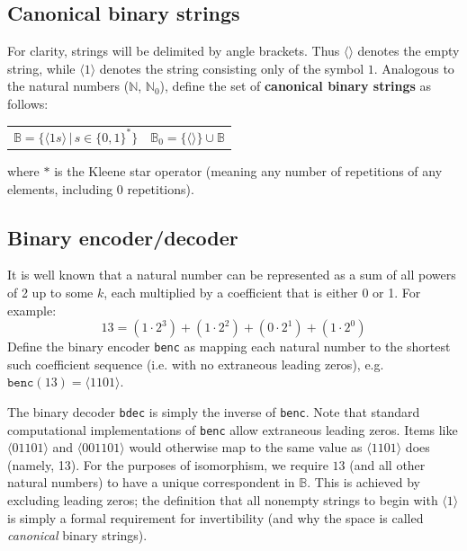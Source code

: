 \documentclass[12pt,reqno]{article}
\begin{document}
\subsection{Canonical binary strings}

For clarity, strings will be delimited by angle brackets. Thus $\langle \rangle$ denotes the empty string, while $\langle 1 \rangle$ denotes the string consisting only of the symbol $1$. Analogous to the natural numbers ($\mathbb{N}$, $\mathbb{N}_0$), define the set of \textbf{canonical binary strings} as follows:

\begin{center} \begin{tabular}{lr} 
    $\mathbb{B} = \{ \langle 1s \rangle \, | \, s \in \{0,1\}^{*} \}$ & $\mathbb{B}_0 = \{ \langle \rangle \} \cup \mathbb{B}$
\end{tabular} \end{center}
where $*$ is the Kleene star operator (meaning any number of repetitions of any elements, including 0 repetitions).

\subsection{Binary encoder/decoder}

It is well known that a natural number can be represented as a sum of all powers of 2 up to some $k$, each multiplied by a coefficient that is either 0 or 1. For example:
\begin{equation}
  13 = (1 \cdot 2^3) + (1 \cdot 2^2) + (0 \cdot 2^1) + (1 \cdot 2^0)
\end{equation}
Define the binary encoder \texttt{benc} as mapping each natural number to the shortest such coefficient sequence (i.e. with no extraneous leading zeros), e.g. $\texttt{benc}(13) = \langle 1101 \rangle$.

The binary decoder \texttt{bdec} is simply the inverse of \texttt{benc}. Note that standard computational implementations of \texttt{benc} allow extraneous leading zeros. Items like $\langle 01101 \rangle$ and $\langle 001101 \rangle$ would otherwise map to the same value as $\langle 1101 \rangle$ does (namely, 13). For the purposes of isomorphism, we require $13$ (and all other natural numbers) to have a unique correspondent in $\mathbb{B}$. This is achieved by excluding leading zeros; the definition that all nonempty strings to begin with $\langle 1 \rangle$ is simply a formal requirement for invertibility (and why the space is called \textit{canonical} binary strings).
\end{document}
